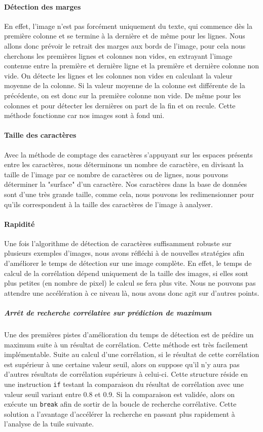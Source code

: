 \documentclass[a4paper,12pt,titlepage]{report}
\begin{document}
	\paragraph{Détection des marges} 
	En effet, l'image n'est pas forcément uniquement du texte, qui commence dès la première colonne et se termine à la dernière et de même pour les lignes.
	Nous allons donc prévoir le retrait des marges aux bords de l'image, pour cela nous cherchons les premières lignes et colonnes non vides, en extrayant l'image contenue entre la première et dernière ligne et la première et dernière colonne non vide. On détecte les lignes et les colonnes non vides en calculant la valeur moyenne de la colonne. Si la valeur moyenne de la colonne est différente de la précédente, on est donc sur la première colonne non vide. De même pour les colonnes et pour détecter les dernières on part de la fin et on recule.
	Cette méthode fonctionne car nos images sont à fond uni.
	\paragraph{Taille des caractères}
	Avec la méthode de comptage des caractères s'appuyant sur les espaces présents entre les caractères, nous déterminons un nombre de caractère, en divisant la taille de l'image par ce nombre de caractères ou de lignes, nous pouvons déterminer la "surface" d'un caractère. Nos caractères dans la base de données sont d'une très grande taille, comme cela, nous pouvons les redimensionner pour qu'ils correspondent à la taille des caractères de l'image à analyser.
	\paragraph{Rapidité}
	Une fois l'algorithme de détection de caractères suffisamment robuste sur plusieurs exemples d'images, nous avons réfléchi à de nouvelles stratégies afin d'améliorer le temps de détection sur une image complète.
	En effet, le temps de calcul de la corrélation dépend uniquement de la taille des images, si elles sont plus petites (en nombre de pixel) le calcul se fera plus vite. Nous ne pouvons pas attendre une accélération à ce niveau là, nous avons donc agit sur d'autres points.
	\subparagraph{Arrêt de recherche corrélative sur prédiction de maximum}
	\label{stop_cor}
	Une des premières pistes d'amélioration du temps de détection est de prédire un maximum suite à un résultat de corrélation. Cette méthode est très facilement implémentable. Suite au calcul d'une corrélation, si le résultat de cette corrélation est supérieur à une certaine valeur seuil, alors on suppose qu'il n'y aura pas d'autres résultats de corrélation supérieurs à celui-ci. Cette structure réside en une instruction \texttt{if} testant la comparaison du résultat de corrélation avec une valeur seuil variant entre 0.8 et 0.9. Si la comparaison est validée, alors on exécute un \texttt{break} afin de sortir de la boucle de recherche corrélative. Cette solution a l'avantage d'accélérer la recherche en passant plus rapidement à l'analyse de la tuile suivante.
	
\end{document}
